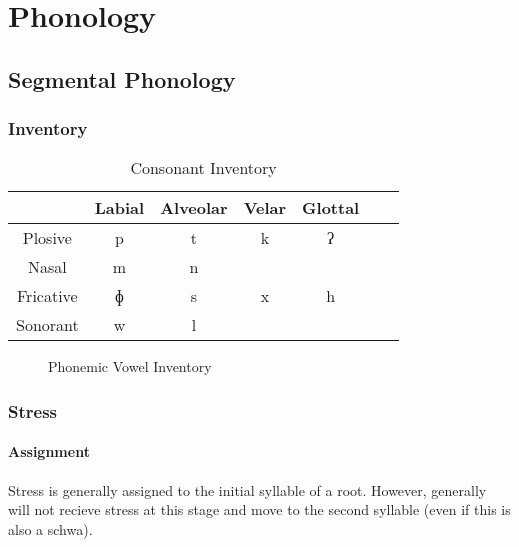 \part{Phonology}

\chapter{Segmental Phonology}
\section{Inventory}

\begin{table}[ht]
  \centering
  \begin{tabular}{*{7}{c}}
    \toprule
    & Labial & Alveolar & Velar & Glottal \\\midrule
    Plosive   & p      & t        & k     & ʔ       \\
    Nasal     & m      & n        &       &         \\
    Fricative & ɸ      & s        & x     & h       \\
    Sonorant  & w      & l        &       &         \\
    \bottomrule
  \end{tabular}
  \caption{Consonant Inventory}
  \label{table:consonants}
\end{table}


\begin{figure}[ht]
  \centering
  \begin{vowel}
  \end{vowel}
  \caption{Phonemic Vowel Inventory}
  \label{table:vowel_phonemes}
\end{figure}
\vfill %
\section{Stress}
\subsection{Assignment}
Stress is generally assigned to the initial syllable of a root. However,  generally will not recieve stress at this stage and move to the second syllable (even if this is also a schwa).

